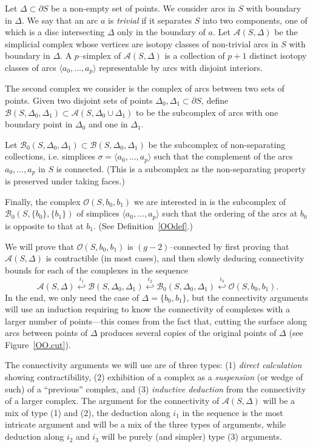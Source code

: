 \documentclass[10pt]{amsart}
\newcommand{\vs}{\vspace{4mm}}
\newcommand{\A}{\mathcal{A}}
\newcommand{\BB}{\mathcal{B}}
\newcommand{\OO}{\mathcal{O}}
\newcommand{\De}{\Delta}
\newcommand{\s}{\sigma}
\newcommand{\sta}{\stackrel}
\newcommand{\lgl}{\langle}
\newcommand{\rgl}{\rangle}
\newcommand{\del}{\partial}
\begin{document}
\medskip


Let $\Delta\subset \del S$ be a non-empty 
set of points. We consider arcs in $S$ with boundary in $\Delta$. We say that an arc $a$ is
{\em trivial} if it separates $S$ into two components, one of which is a disc intersecting $\Delta$ only in the boundary
of $a$. 
Let $\A(S,\Delta)$ be the simplicial complex whose vertices are isotopy classes of non-trivial arcs in $S$ with boundary in $\Delta$. A
$p$--simplex of $\A(S,\Delta)$ is a collection of $p+1$ distinct isotopy classes of arcs $\lgl a_0,\dots,a_p\rgl$ representable by arcs 
with disjoint interiors. 

The second complex we consider is the complex of arcs between two sets of points. 
Given two disjoint sets of points $\Delta_0,\Delta_1\subset \del S$, define
$\BB(S,\De_0,\De_1)\subset \A(S,\De_0\cup\De_1)$ to be the subcomplex of arcs with one boundary point in $\De_0$ and one
in $\De_1$. 

Let $\BB_{0}(S,\De_0,\De_1)\subset \BB(S,\De_0,\De_1)$ be the subcomplex of non-separating collections, i.e. simplices
$\s=\lgl a_0,\dots,a_p\rgl$ such that
the complement of the arcs $a_0,\dots,a_p$ in $S$ is connected. (This is a subcomplex as the non-separating
property is preserved under taking faces.)

Finally, the complex $\OO(S,b_0,b_1)$ we are interested in is the
subcomplex of\\ 
 $\BB_{0}(S,\{b_0\},\{b_1\})$ of
simplices  $\lgl a_0,\dots,a_p\rgl$ such that the ordering of the arcs at $b_0$ is opposite to that at $b_1$. (See
Definition~\ref{OOdef}.)

\vs

We will prove that $\OO(S,b_0,b_1)$ is $(g-2)$--connected by first proving that $\A(S,\Delta)$ is contractible (in most
cases), and then slowly deducing connectivity bounds for each of the complexes in the sequence 
$$\A(S,\Delta) \sta{i_1}{\hookleftarrow} \BB(S,\Delta_0,\Delta_1)\sta{i_2}{\hookleftarrow}\BB_0(S,\De_0,\De_1)\sta{i_3}{\hookleftarrow}\OO(S,b_0,b_1).$$ 
In the end, we only need the case of $\Delta=\{b_0,b_1\}$, but the connectivity arguments will use an induction
requiring to know the connectivity of complexes with a larger number of points---this comes from the fact that,
cutting the surface along arcs between points of $\Delta$ produces several copies of the original points of $\Delta$ 
(see Figure~\ref{OO.cut}).


The connectivity arguments we will use are of three types: (1) {\em direct calculation} showing contractibility,
(2) exhibition of a complex as a {\em suspension} (or wedge of such)
of a ``previous'' complex, and (3) {\em inductive deduction} from the connectivity of a larger complex. 
The argument for the connectivity of $\A(S,\Delta)$ will be a mix of type (1) and (2), the deduction along $i_1$ in the sequence is the
most intricate argument and will be a mix of the three types of arguments, while deduction along $i_2$ and $i_3$ will be
purely (and simpler) type (3) arguments. 
\end{document}
